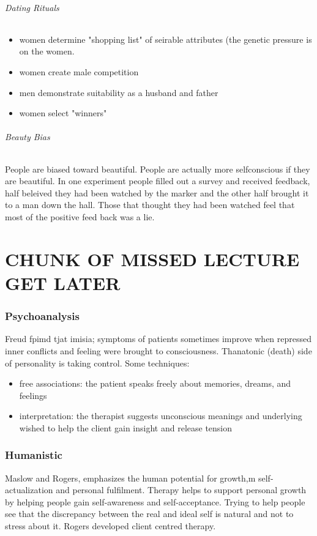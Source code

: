 \documentclass[12pt]{article}
\begin{document}
\paragraph*{Dating Rituals}
\begin{itemize}
\item women determine "shopping list" of seirable attributes (the genetic pressure is on the women. 
\item women create male competition
\item men demonstrate suitability as a husband and father
\item women select "winners"
\end{itemize}
\paragraph*{Beauty Bias}
People are biased toward beautiful. People are actually more selfconscious if they are beautiful. In one experiment people filled out a survey and received feedback, half beleived they had been watched by the marker and the other half brought it to a man down the hall. Those that thought they had been watched feel that most of the positive feed back was a lie.

\part*{CHUNK OF MISSED LECTURE GET LATER}

\section*{Psychoanalysis}
Freud fpimd tjat imisia; symptoms of patients sometimes improve when repressed inner conflicts and feeling were brought to consciousness. Thanatonic (death) side of personality is taking control. Some techniques:
\begin{itemize}
\item free associations: the patient speaks freely about memories, dreams, and feelings
\item interpretation: the therapist suggests unconscious meanings and underlying wished to help the client gain insight and release tension
\end{itemize}
\section*{Humanistic}
Maslow and Rogers, emphasizes the human potential for growth,m self-actualization and personal fulfilment. Therapy helps to support personal growth by helping people gain self-awareness and self-acceptance. Trying to help people see that the discrepancy between the real and ideal self is natural and not to stress about it. Rogers developed client centred therapy.
\end{document}
